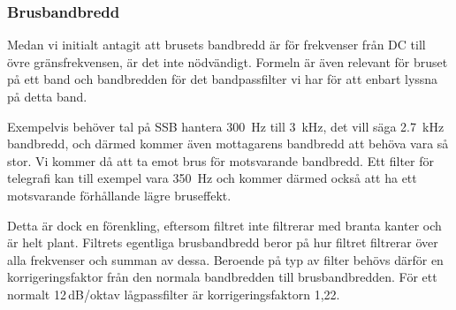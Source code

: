 \subsubsection{Brusbandbredd}

Medan vi initialt antagit att brusets bandbredd är för frekvenser
från DC till övre gränsfrekvensen, är det inte nödvändigt.
Formeln är även relevant för bruset på ett band och bandbredden för det
bandpassfilter vi har för att enbart lyssna på detta band.

Exempelvis behöver tal på SSB hantera \SI{300}{\hertz} till \SI{3}{\kilo\hertz},
det vill säga \SI{2,7}{\kilo\hertz} bandbredd, och därmed kommer även
mottagarens bandbredd att behöva vara så stor.
Vi kommer då att ta emot brus för motsvarande bandbredd.
Ett filter för telegrafi kan till exempel vara \SI{350}{\hertz} och kommer
därmed också att ha ett motsvarande förhållande lägre bruseffekt.

Detta är dock en förenkling, eftersom filtret inte filtrerar med branta kanter
och är helt plant.
Filtrets egentliga brusbandbredd beror på hur filtret filtrerar över
alla frekvenser och summan av dessa.
Beroende på typ av filter behövs därför en korrigeringsfaktor
från den normala bandbredden till brusbandbredden.
För ett normalt 12\,dB/oktav lågpassfilter är korrigeringsfaktorn 1,22.

